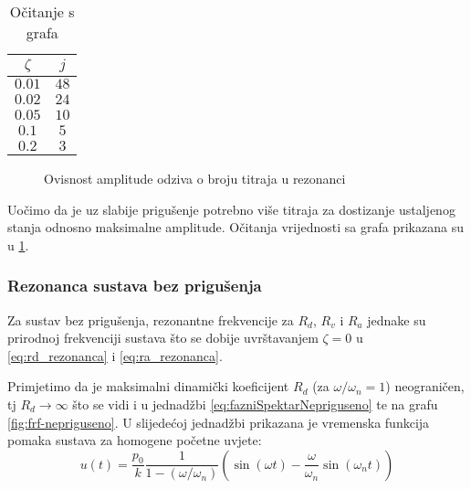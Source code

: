 \par
\begin{minipage}[b][][l]{0.1\textwidth}
\begin{table}[H]
    \begin{tabular}{c | c}
       \hline
        $\zeta$ & $j$\\
        \hline
        $0.01$ & $48$\\
        \hline
        $0.02$ & $24$\\
        \hline
        $0.05$ & $10$\\
        \hline
        $0.1$ & $5$\\
        \hline
        $0.2$ & $3$\\
        \hline
    \end{tabular}
    \caption{Očitanje s grafa}
    \label{table:prirast-rezonanca-priguseno}
\end{table}
\end{minipage}
\hfill
\begin{minipage}[b][][r]{0.8\textwidth}
\begin{figure}[H]
    
    \label{fig:prirast-rezonanca-priguseno}
    \caption{Ovisnost amplitude odziva o broju titraja u rezonanci}
\end{figure}
\end{minipage}
\vspace{6pt}

Uočimo da je uz slabije prigušenje potrebno više titraja za dostizanje ustaljenog
stanja odnosno maksimalne amplitude. Očitanja vrijednosti sa grafa prikazana su u
\ref{table:prirast-rezonanca-priguseno}.

\subsubsection{Rezonanca sustava bez prigušenja}
Za sustav bez prigušenja, rezonantne frekvencije za $R_d$, $R_v$ i $R_a$ jednake su
prirodnoj frekvenciji sustava što se dobije uvrštavanjem $\zeta = 0$ u \eqref{eq:rd_rezonanca} i 
\eqref{eq:ra_rezonanca}. 
\par

Primjetimo da je maksimalni dinamički koeficijent $R_d$ (za $\omega/\omega_n = 1$) 
neograničen, tj $R_d\to \infty$ što se vidi i u jednadžbi \eqref{eq:fazniSpektarNepriguseno} 
te na grafu \ref{fig:frf-nepriguseno}. U slijedećoj jednadžbi prikazana je vremenska 
funkcija pomaka sustava za homogene početne uvjete:
\begin{equation}
    u(t)=\frac{p_0}{k}\frac{1}{1-(\omega/\omega_n)}
            \left(\sin(\omega t) - \frac{\omega}{\omega_n}\sin(\omega_n t)\right)
\end{equation}

